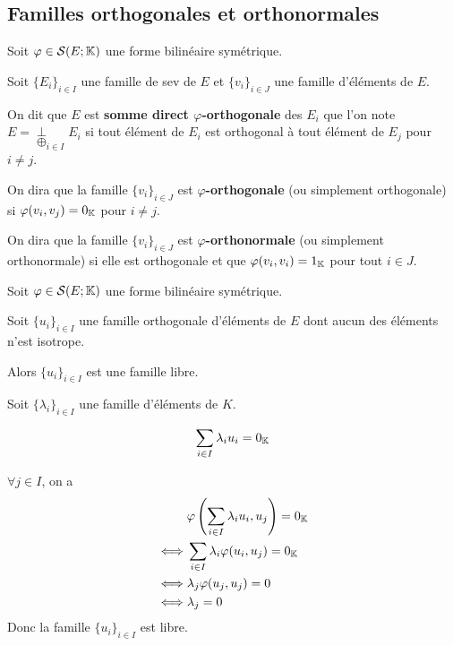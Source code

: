 \documentclass[a4paper,12pt]{article}
\begin{document}
\subsection{Familles orthogonales et orthonormales}

\begin{definition}
    Soit $\varphi \in \mathcal{S}(E; \mathbb{K})$ une forme bilinéaire symétrique.

    Soit $\{E_i\}_{i \in I}$ une famille de sev de $E$ et $\{v_i\}_{i \in J}$ une famille d'éléments de $E$.

    On dit que $E$ est \textbf{somme direct $\varphi$-orthogonale} des $E_i$ que l'on note $E = \underset{\bigoplus}{\perp}_{i \in I} E_i$ 
    si tout élément de $E_i$ est orthogonal à tout élément de $E_j$ pour $i \neq j$.

    On dira que la famille $\{v_i\}_{i \in J}$ est \textbf{$\varphi$-orthogonale} (ou simplement orthogonale) si $\varphi(v_i, v_j) = 0_{\mathbb{K}}$ pour $i \neq j$.

    On dira que la famille $\{v_i\}_{i \in J}$ est \textbf{$\varphi$-orthonormale} (ou simplement orthonormale) si elle est orthogonale et que $\varphi(v_i, v_i) = 1_{\mathbb{K}}$ pour tout $i \in J$.
\end{definition}

\begin{proposition}{}{}
    Soit $\varphi \in \mathcal{S}(E; \mathbb{K})$ une forme bilinéaire symétrique.

    Soit $\{u_i\}_{i \in I}$ une famille orthogonale d'éléments de $E$ dont aucun des éléments n'est isotrope.

    Alors $\{u_i\}_{i \in I}$ est une famille libre.
\end{proposition}

\begin{demonstration}
    Soit $\{\lambda_i\}_{i \in I}$ une famille d'éléments de $K$.

    $$
    \sum_{i \in I} \lambda_i u_i = 0_{\mathbb{K}}
    $$

    $\forall j \in I$, on a
    \begin{align*}
        &\varphi\left(\sum_{i \in I} \lambda_i u_i, u_j\right) = 0_{\mathbb{K}} \\
        \iff &\sum_{i \in I} \lambda_i \varphi(u_i, u_j) = 0_{\mathbb{K}} \\
        \iff &\lambda_j \varphi(u_j, u_j) = 0 \\
        \iff &\lambda_j = 0
    \end{align*}
    Donc la famille $\{u_i\}_{i \in I}$ est libre.
\end{demonstration}
\end{document}
